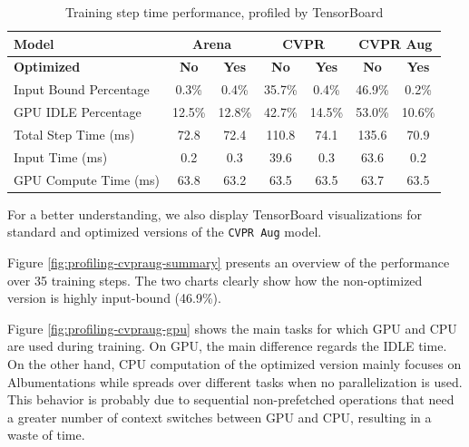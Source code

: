 \begin{table}[H]
	\caption{Training step time performance, profiled by TensorBoard}
	\label{tab:data-generator-profiling}
	\centering
	\begin{tabular}{|l|c|c||c|c||c|c|}
		\hline
		\textbf{Model} & \multicolumn{2}{|c||}{\textbf{Arena}} & \multicolumn{2}{|c||}{\textbf{CVPR}} & \multicolumn{2}{|c|}{\textbf{CVPR Aug}} \\
		\hline
		\textbf{Optimized} & \textbf{No} & \textbf{Yes} & \textbf{No} & \textbf{Yes} & \textbf{No} & \textbf{Yes} \\
		\hline
		Input Bound Percentage      &  0.3\% &  0.4\% & 35.7\% &  0.4\% & 46.9\% &  0.2\% \\
		GPU IDLE Percentage         & 12.5\% & 12.8\% & 42.7\% & 14.5\% & 53.0\% & 10.6\% \\
		\hline
		Total Step Time (ms)        &   72.8 &   72.4 &  110.8 &   74.1 &  135.6 &   70.9 \\
		Input Time (ms)             &    0.2 &    0.3 &   39.6 &    0.3 &   63.6 &    0.2 \\
		GPU Compute Time (ms)       &   63.8 &   63.2 &   63.5 &   63.5 &   63.7 &   63.5 \\
		\hline
	\end{tabular}
\end{table}

For a better understanding, we also display TensorBoard visualizations for standard and optimized versions of the \texttt{CVPR Aug} model. 

Figure \ref{fig:profiling-cvpraug-summary} presents an overview of the performance over 35 training steps. The two charts clearly show how the non-optimized version is highly input-bound (46.9\%).

Figure \ref{fig:profiling-cvpraug-gpu} shows the main tasks for which GPU and CPU are used during training. On GPU, the main difference regards the IDLE time. On the other hand, CPU computation of the optimized version mainly focuses on Albumentations while spreads over different tasks when no parallelization is used. This behavior is probably due to sequential non-prefetched operations that need a greater number of context switches between GPU and CPU, resulting in a waste of time.


